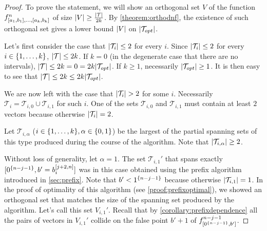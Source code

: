 \begin{proof}
To prove the statement,
we will show an orthogonal set $V$ of the function
$f^n_{[a_1, b_1], \ldots, [a_k, b_k]}$
of size
$\lvert V\rvert \geq \frac{\lvert\mathcal{T}\rvert}{2k}$.
By \autoref{theorem:orthodnf},
the existence of such orthogonal set
gives a lower bound $\lvert V\rvert$
on $\lvert\mathcal{T}_{opt}\rvert$.

Let's first consider the case that
$\lvert\mathcal{T}_i\rvert \leq 2$ for every $i$.
Since $\lvert\mathcal{T}_i\rvert \leq 2$
for every $i \in \{1, \ldots, k\}$,
$\lvert\mathcal{T}\rvert \leq 2k$.
If $k = 0$
(in the degenerate case that there are no intervals),
$\lvert\mathcal{T}\rvert \leq 2k = 0
= 2k \lvert\mathcal{T}_{opt}\rvert$.
If $k \geq 1$,
necessarily $\lvert\mathcal{T}_{opt}\rvert \geq 1$.
It is then easy to see that
$\lvert\mathcal{T}\rvert
\leq 2k \leq 2k \lvert\mathcal{T}_{opt}\rvert$.

We are now left with the case that
$\lvert\mathcal{T}_i\rvert > 2$ for some $i$.
Necessarily $\mathcal{T}_i
= \mathcal{T}_{i,0} \cup \mathcal{T}_{i,1}$
for such $i$.
One of the sets
$\mathcal{T}_{i,0}$ and $\mathcal{T}_{i,1}$
must contain at least $2$ vectors
because otherwise $\lvert\mathcal{T}_i\rvert = 2$.

Let $\mathcal{T}_{i, \alpha}$
($i \in \{1, \ldots, k\}, \alpha \in \{0, 1\}$)
be the largest
of the partial spanning sets of this type
produced during the course of the algorithm.
Note that $\lvert\mathcal{T}_{i,\alpha}\rvert \geq 2$.

Without loss of generality,
let $\alpha = 1$.
The set $\mathcal{T}_{i, 1}'$
that spans exactly
$[0^{\{n-j-1\}}, b' = b_i^{[j+2, n]}]$
was in this case obtained
using the prefix algorithm
introduced in \cref{sec:prefix}.
Note that $b' < 1^{\{n-j-1\}}$
because otherwise $\lvert\mathcal{T}_{i,1}\rvert = 1$.
In the proof of optimality of this algorithm
(see \autoref{proof:prefixoptimal}),
we showed an orthogonal set that matches the size
of the spanning set produced by the algorithm.
Let's call this set $V_{i, 1}'$.
Recall that by \cref{corollary:prefixdependence}
all the pairs of vectors in $V_{i, 1}'$
collide on the false point $b' + 1$
of $f^{n-j-1}_{[0^{\{n-j-1\}}, b']}$.


\end{proof}
